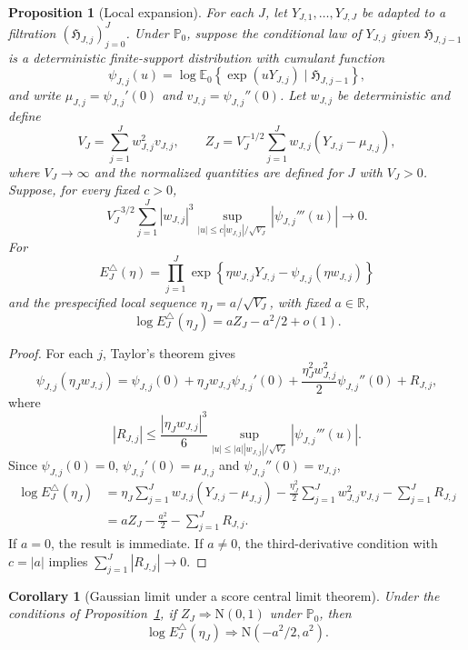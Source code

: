\documentclass[12pt]{article}
\newtheorem{proposition}[theorem]{Proposition}
\newtheorem{corollary}[theorem]{Corollary}
\theoremstyle{definition}
\theoremstyle{remark}
\begin{document}
\begin{proposition}[Local expansion]
\label{prop:local-expansion}
For each $J$, let $Y_{J,1},\ldots,Y_{J,J}$ be adapted to a filtration $(\mathfrak H_{J,j})_{j=0}^J$. Under $\mathbb P_0$, suppose the conditional law of $Y_{J,j}$ given $\mathfrak H_{J,j-1}$ is a deterministic finite-support distribution with cumulant function
\[
 \psi_{J,j}(u)=\log\mathbb E_0\left\{\exp(uY_{J,j})\mid\mathfrak H_{J,j-1}\right\},
\]
and write $\mu_{J,j}=\psi_{J,j}'(0)$ and $v_{J,j}=\psi_{J,j}''(0)$. Let $w_{J,j}$ be deterministic and define
\[
 V_J=\sum_{j=1}^J w_{J,j}^2v_{J,j},
 \qquad
 Z_J=V_J^{-1/2}\sum_{j=1}^J w_{J,j}(Y_{J,j}-\mu_{J,j}),
\]
where $V_J\to\infty$ and the normalized quantities are defined for $J$ with $V_J>0$. Suppose, for every fixed $c>0$,
\[
 V_J^{-3/2}\sum_{j=1}^J |w_{J,j}|^3
 \sup_{|u|\leq c|w_{J,j}|/\sqrt{V_J}}|\psi_{J,j}'''(u)|
 \longrightarrow0.
\]
For
\[
 E_J^\triangle(\eta)=
 \prod_{j=1}^J
 \exp\left\{\eta w_{J,j}Y_{J,j}-\psi_{J,j}(\eta w_{J,j})\right\}
\]
and the prespecified local sequence $\eta_J=a/\sqrt{V_J}$, with fixed $a\in\mathbb R$,
\[
 \log E_J^\triangle(\eta_J)=aZ_J-a^2/2+o(1).
\]
\end{proposition}

\begin{proof}
For each $j$, Taylor's theorem gives
\[
 \psi_{J,j}(\eta_{J}w_{J,j})
 =\psi_{J,j}(0)+\eta_{J}w_{J,j}\psi_{J,j}'(0)
  +\frac{\eta_J^2w_{J,j}^2}{2}\psi_{J,j}''(0)+R_{J,j},
\]
where
\[
 |R_{J,j}|\leq \frac{|\eta_{J}w_{J,j}|^3}{6}
 \sup_{|u|\leq |a||w_{J,j}|/\sqrt{V_J}}|\psi_{J,j}'''(u)|.
\]
Since $\psi_{J,j}(0)=0$, $\psi_{J,j}'(0)=\mu_{J,j}$ and $\psi_{J,j}''(0)=v_{J,j}$,
\begin{align*}
 \log E_J^\triangle(\eta_J)
 &=\eta_J\sum_{j=1}^J w_{J,j}(Y_{J,j}-\mu_{J,j})
   -\frac{\eta_J^2}{2}\sum_{j=1}^J w_{J,j}^2v_{J,j}
   -\sum_{j=1}^{J}R_{J,j}\\
 &=aZ_J-\frac{a^2}{2}-\sum_{j=1}^{J}R_{J,j}.
\end{align*}
If $a=0$, the result is immediate. If $a\neq0$, the third-derivative condition with $c=|a|$ implies $\sum_{j=1}^J|R_{J,j}|\to0$.
\end{proof}

\begin{corollary}[Gaussian limit under a score central limit theorem]
\label{cor:local-gaussian}
Under the conditions of Proposition~\ref{prop:local-expansion}, if $Z_J\Rightarrow\mathrm{N}(0,1)$ under $\mathbb P_0$, then
\[
 \log E_J^\triangle(\eta_J)\Rightarrow\mathrm{N}\left(-a^2/2,a^2\right).
\]
\end{corollary}
\end{document}
